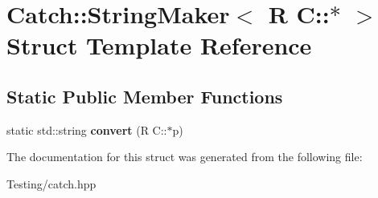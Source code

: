 \hypertarget{struct_catch_1_1_string_maker_3_01_r_01_c_1_1_5_01_4}{\section{Catch\-:\-:String\-Maker$<$ R C\-:\-:$\ast$ $>$ Struct Template Reference}
\label{struct_catch_1_1_string_maker_3_01_r_01_c_1_1_5_01_4}
}
\subsection*{Static Public Member Functions}
\begin{DoxyCompactItemize}
\item 
\hypertarget{struct_catch_1_1_string_maker_3_01_r_01_c_1_1_5_01_4_af69c15e0b406e945777137fe4a333731}{static std\-::string {\bfseries convert} (R C\-::$\ast$p)}\label{struct_catch_1_1_string_maker_3_01_r_01_c_1_1_5_01_4_af69c15e0b406e945777137fe4a333731}

\end{DoxyCompactItemize}


The documentation for this struct was generated from the following file\-:\begin{DoxyCompactItemize}
\item 
Testing/catch.\-hpp\end{DoxyCompactItemize}
